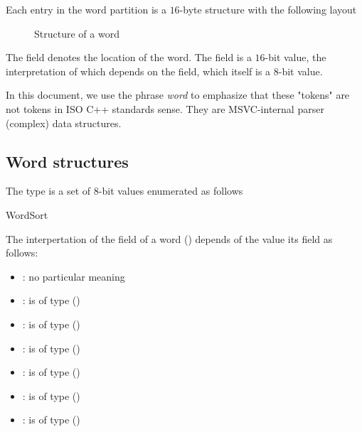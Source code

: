 Each entry in the word partition is a $16$-byte structure with the following layout
%
\begin{figure}[H]
	\centering
	\caption{Structure of a word}
	\label{fig:ifc-word-structure}
\end{figure}
%
The  field denotes the location of the word.
The  field is a $16$-bit value, the interpretation of which depends
on the  field, which itself is a $8$-bit value.  

In this document, we use the phrase \emph{word} to emphasize that these "tokens" are not tokens in ISO C++ standards sense.
They are MSVC-internal parser (complex) data structures.


\subsection{Word structures}
\label{sec:ifc:word-structures}

The type  is a set of 8-bit values enumerated as follows
\begin{Enumeration}{WordSort}
\end{Enumeration}

The interpertation of the  field of a 
word ()
depends of the value its  field as follows:
\begin{itemize}
	\item {}: no particular meaning
	\item {}:  is of type
		 ()
	\item {}:  is of type 
	 ()
	\item {}:  is of type
	   ()
	\item {}:  is of type
	    ()
	\item {}:  is of type
		 ()
	\item {}:  is of type
	     ()
\end{itemize}

